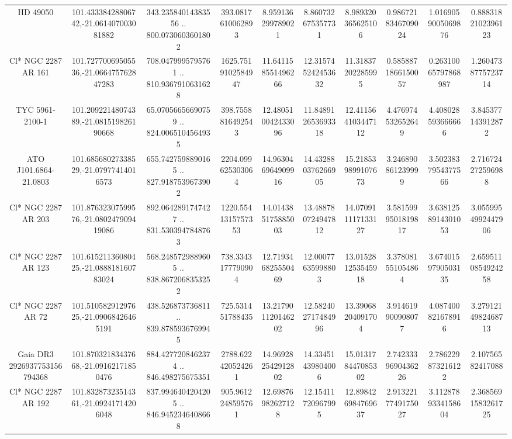 \begin{table}
\begin{tabular}{cccccccccc}
HD  49050 & 101.43338428806742,-21.061407003081882 & 343.23584014383556 .. 800.0730603601802 & 393.0817610062893 & 8.959136299789021 & 8.860732675357731 & 8.989320365625106 & 0.9867218346709024 & 1.0169059005069876 & 0.8883182102396123 \\
Cl* NGC 2287     AR     161 & 101.72770069505536,-21.066475762847283 & 708.0479995795761 .. 810.9367910631628 & 1625.7519102584947 & 11.641158551496266 & 12.315745242453632 & 11.31837202285995 & 0.5858871866150057 & 0.26310065797868987 & 1.2604738775723714 \\
TYC 5961-2100-1 & 101.20922148074389,-21.081519826190668 & 65.07056656690759 .. 824.0065104564935 & 398.7558816492543 & 12.480510042433096 & 11.848912653693318 & 12.411564103447112 & 4.476974532652649 & 4.408028593666666 & 3.845377143912872 \\
ATO J101.6864-21.0803 & 101.68568027338529,-21.07977414016573 & 655.7427598890165 .. 827.9187539673902 & 2204.099625303064 & 14.963046964909916 & 14.432880376266905 & 15.218539899107673 & 3.246890861239999 & 3.5023837954377566 & 2.716724272596988 \\
Cl* NGC 2287     AR     203 & 101.87632307599576,-21.080247909419086 & 892.0642891747427 .. 831.5303947848763 & 1220.5541315757353 & 14.014385175885003 & 13.488780724947812 & 14.070911117133127 & 3.5815999501819817 & 3.6381258914301053 & 3.0559954992447906 \\
Cl* NGC 2287     AR     123 & 101.61521136080425,-21.088818160783024 & 568.2485729889605 .. 838.8672068353252 & 738.3343177790904 & 12.719346825550469 & 12.00077635998803 & 13.015281253545918 & 3.378081551054864 & 3.6740159790503135 & 2.6595110854924258 \\
Cl* NGC 2287     AR      72 & 101.51058291297625,-21.09068426465191 & 438.526873736811 .. 839.8785936769945 & 725.531451788435 & 13.217901120146202 & 12.582402717484996 & 13.39068204091704 & 3.914619900908077 & 4.087400821678916 & 3.2791214982468713 \\
Gaia DR3 2926937753156794368 & 101.87032183437668,-21.09162171850476 & 884.4277208462374 .. 846.498275675351 & 2788.622420524261 & 14.969282542912802 & 14.33451439804006 & 15.013178447085302 & 2.7423339690436226 & 2.786229873216122 & 2.10756582417088 \\
Cl* NGC 2287     AR     192 & 101.83287323514361,-21.09241714206048 & 837.9946404204205 .. 846.9452346408668 & 905.9612248595761 & 12.69876982627128 & 12.15411720967995 & 12.898426984769637 & 2.9132217749175027 & 3.1128789334158604 & 2.3685691583261725 \\

\end{tabular}
\end{table}
